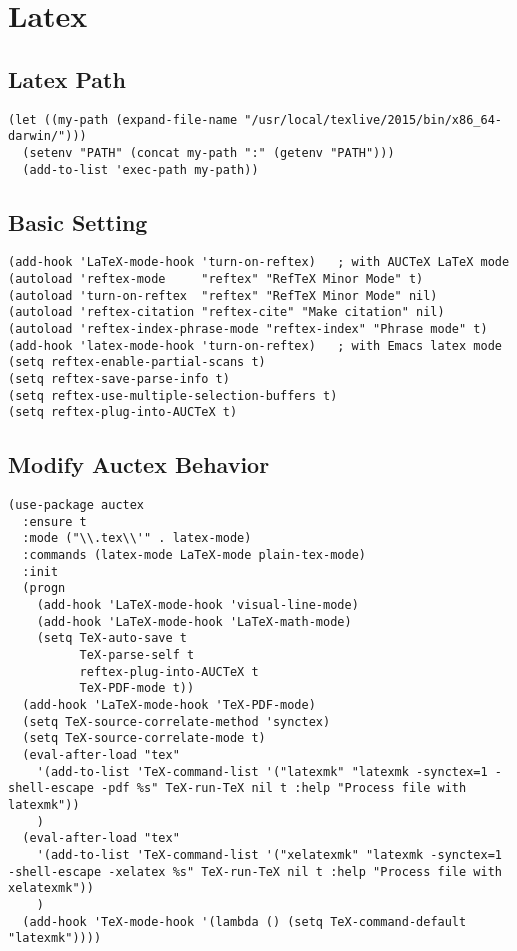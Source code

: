 \documentclass[11pt]{article}
\begin{document}
\section{Latex}
\label{sec:orgheadline38}
\subsection{Latex Path}
\label{sec:orgheadline31}
\begin{verbatim}
(let ((my-path (expand-file-name "/usr/local/texlive/2015/bin/x86_64-darwin/")))
  (setenv "PATH" (concat my-path ":" (getenv "PATH")))
  (add-to-list 'exec-path my-path))
\end{verbatim}
\subsection{Basic Setting}
\label{sec:orgheadline32}
\begin{verbatim}
(add-hook 'LaTeX-mode-hook 'turn-on-reftex)   ; with AUCTeX LaTeX mode
(autoload 'reftex-mode     "reftex" "RefTeX Minor Mode" t)
(autoload 'turn-on-reftex  "reftex" "RefTeX Minor Mode" nil)
(autoload 'reftex-citation "reftex-cite" "Make citation" nil)
(autoload 'reftex-index-phrase-mode "reftex-index" "Phrase mode" t)
(add-hook 'latex-mode-hook 'turn-on-reftex)   ; with Emacs latex mode
(setq reftex-enable-partial-scans t)
(setq reftex-save-parse-info t)
(setq reftex-use-multiple-selection-buffers t)
(setq reftex-plug-into-AUCTeX t)
\end{verbatim}
\subsection{Modify Auctex Behavior}
\label{sec:orgheadline33}
\begin{verbatim}
(use-package auctex
  :ensure t
  :mode ("\\.tex\\'" . latex-mode)
  :commands (latex-mode LaTeX-mode plain-tex-mode)
  :init
  (progn
    (add-hook 'LaTeX-mode-hook 'visual-line-mode)
    (add-hook 'LaTeX-mode-hook 'LaTeX-math-mode)
    (setq TeX-auto-save t
          TeX-parse-self t
          reftex-plug-into-AUCTeX t
          TeX-PDF-mode t))
  (add-hook 'LaTeX-mode-hook 'TeX-PDF-mode)
  (setq TeX-source-correlate-method 'synctex)
  (setq TeX-source-correlate-mode t)
  (eval-after-load "tex"
    '(add-to-list 'TeX-command-list '("latexmk" "latexmk -synctex=1 -shell-escape -pdf %s" TeX-run-TeX nil t :help "Process file with latexmk"))
    )
  (eval-after-load "tex"
    '(add-to-list 'TeX-command-list '("xelatexmk" "latexmk -synctex=1 -shell-escape -xelatex %s" TeX-run-TeX nil t :help "Process file with xelatexmk"))
    )
  (add-hook 'TeX-mode-hook '(lambda () (setq TeX-command-default "latexmk"))))
\end{verbatim}
\end{document}
